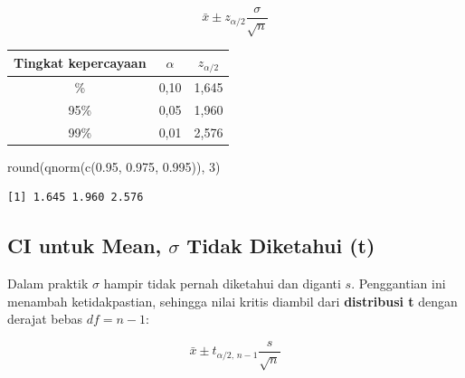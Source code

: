 \documentclass[
  indonesian,
  letterpaper,
]{book}
\newenvironment{Shaded}{\begin{snugshade}}{\end{snugshade}}
\newcommand{\DecValTok}[1]{\textcolor[rgb]{0.68,0.00,0.00}{#1}}
\newcommand{\FloatTok}[1]{\textcolor[rgb]{0.68,0.00,0.00}{#1}}
\newcommand{\FunctionTok}[1]{\textcolor[rgb]{0.28,0.35,0.67}{#1}}
\newcommand{\NormalTok}[1]{\textcolor[rgb]{0.00,0.23,0.31}{#1}}
\newcounter{none} %
\begin{document}
\[\bar{x} \pm z_{\alpha/2}\frac{\sigma}{\sqrt{n}}\]

{\def\LTcaptype{none} %
\begin{longtable}[]{@{}ccc@{}}
\toprule\noalign{}
Tingkat kepercayaan & \(\alpha\) & \(z_{\alpha/2}\) \\
\midrule\noalign{}
\endhead
\bottomrule\noalign{}
\endlastfoot
90\% & 0,10 & 1,645 \\
95\% & 0,05 & 1,960 \\
99\% & 0,01 & 2,576 \\
\end{longtable}
}

\begin{Shaded}
\begin{Highlighting}[]
\FunctionTok{round}\NormalTok{(}\FunctionTok{qnorm}\NormalTok{(}\FunctionTok{c}\NormalTok{(}\FloatTok{0.95}\NormalTok{, }\FloatTok{0.975}\NormalTok{, }\FloatTok{0.995}\NormalTok{)), }\DecValTok{3}\NormalTok{)}
\end{Highlighting}
\end{Shaded}

\begin{verbatim}
[1] 1.645 1.960 2.576
\end{verbatim}

\subsection{\texorpdfstring{CI untuk Mean, \(\sigma\) Tidak Diketahui
(t)}{CI untuk Mean, \textbackslash sigma Tidak Diketahui (t)}}\label{ci-untuk-mean-sigma-tidak-diketahui-t}

Dalam praktik \(\sigma\) hampir tidak pernah diketahui dan diganti
\(s\). Penggantian ini menambah ketidakpastian, sehingga nilai kritis
diambil dari \textbf{distribusi t} dengan derajat bebas \(df = n - 1\):

\[\bar{x} \pm t_{\alpha/2,\, n-1}\frac{s}{\sqrt{n}}\]
\end{document}
